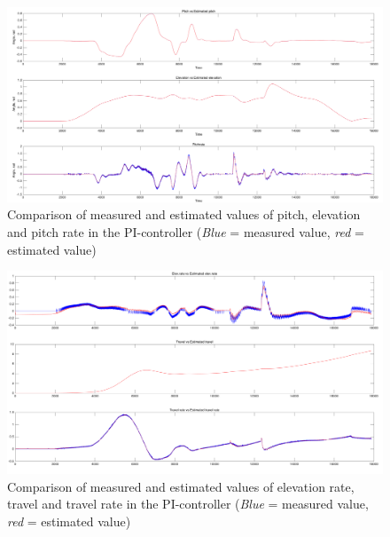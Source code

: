 \begin{figure}[H]
    \centering
    \includegraphics[width=1.0\textwidth]{pitchrate_PI.png}
    \caption{Comparison of measured and estimated values of pitch, elevation and pitch rate in the PI-controller (\emph{\color{blue}Blue} = measured value, \emph{\color{red} red} = estimated value)}
    \label{fig:plot3}
\end{figure}

\begin{figure}[H]
    \centering
    \includegraphics[width=1.0\textwidth]{elevrate_PI.png}
    \caption{Comparison of measured and estimated values of elevation rate, travel and travel rate in the PI-controller (\emph{\color{blue}Blue} = measured value, \emph{\color{red} red} = estimated value)}
    \label{fig:plot4}
\end{figure}

